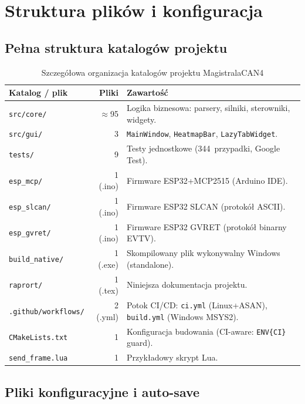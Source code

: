 \documentclass[12pt, a4paper]{article}
\begin{document}
\section{Struktura plików i konfiguracja}

\subsection{Pełna struktura katalogów projektu}

\begin{table}[H]
\caption{Szczegółowa organizacja katalogów projektu MagistralaCAN4}
\label{tab:dirs}
\centering
\small
\begin{tabular}{p{5.0cm}rp{8.0cm}}
\toprule
\textbf{Katalog / plik} & \textbf{Pliki} & \textbf{Zawartość} \\
\midrule
\texttt{src/core/}           & $\approx$95 &
  Logika biznesowa: parsery, silniki, sterowniki, widgety. \\
\texttt{src/gui/}            & 3 &
  \texttt{MainWindow}, \texttt{HeatmapBar}, \texttt{LazyTabWidget}. \\
\texttt{tests/}              & 9 &
  Testy jednostkowe (344~przypadki, Google Test). \\
\texttt{esp\_mcp/}           & 1 (.ino) &
  Firmware ESP32+MCP2515 (Arduino IDE). \\
\texttt{esp\_slcan/}         & 1 (.ino) &
  Firmware ESP32 SLCAN (protokół ASCII). \\
\texttt{esp\_gvret/}         & 1 (.ino) &
  Firmware ESP32 GVRET (protokół binarny EVTV). \\
\texttt{build\_native/}      & 1 (.exe) &
  Skompilowany plik wykonywalny Windows (standalone). \\
\texttt{raprort/}            & 1 (.tex) &
  Niniejsza dokumentacja projektu. \\
\texttt{.github/workflows/}  & 2 (.yml) &
  Potok CI/CD: \texttt{ci.yml} (Linux+ASAN), \texttt{build.yml} (Windows MSYS2). \\
\texttt{CMakeLists.txt}      & 1 &
  Konfiguracja budowania (CI-aware: \texttt{ENV\{CI\}} guard). \\
\texttt{send\_frame.lua}     & 1 &
  Przykładowy skrypt Lua. \\
\bottomrule
\end{tabular}
\end{table}

\subsection{Pliki konfiguracyjne i auto-save}
\end{document}
